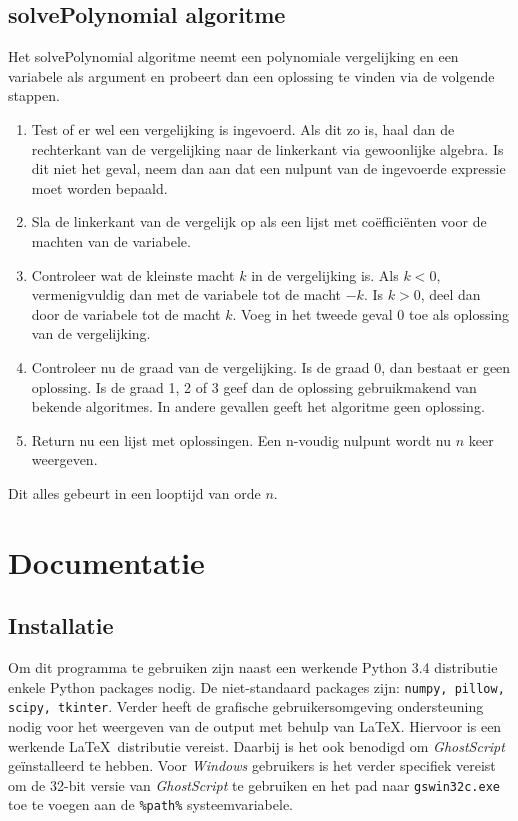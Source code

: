 \documentclass[a4paper]{article}
\begin{document}
\subsection{solvePolynomial algoritme}
Het solvePolynomial algoritme neemt een polynomiale vergelijking en een variabele als argument en probeert dan een oplossing te vinden via de volgende stappen.
\begin{enumerate}
\item Test of er wel een vergelijking is ingevoerd. Als dit zo is, haal dan de rechterkant van de vergelijking naar de linkerkant via gewoonlijke algebra. Is dit niet het geval, neem dan aan dat een nulpunt van de ingevoerde expressie moet worden bepaald.
\item Sla de linkerkant van de vergelijk op als een lijst met co\"effici\"enten voor de machten van de variabele. 
\item Controleer wat de kleinste macht $k$ in de vergelijking is. Als $k<0$, vermenigvuldig dan met de variabele tot de macht $-k$. Is $k>0$, deel dan door de variabele tot de macht $k$. Voeg in het tweede geval 0 toe als oplossing van de vergelijking.
\item Controleer nu de graad van de vergelijking. Is de graad 0, dan bestaat er geen oplossing. Is de graad 1, 2 of 3 geef dan de oplossing gebruikmakend van bekende algoritmes. In andere gevallen geeft het algoritme geen oplossing.
\item Return nu een lijst met oplossingen. Een n-voudig nulpunt wordt nu $n$ keer weergeven.
\end{enumerate}

Dit alles gebeurt in een looptijd van orde $n$. 

\section{Documentatie}
\subsection{Installatie}
Om dit programma te gebruiken zijn naast een werkende Python 3.4 distributie enkele Python packages nodig. De niet-standaard packages zijn: \texttt{numpy, pillow, scipy, tkinter}.
Verder heeft de grafische gebruikersomgeving ondersteuning nodig voor het weergeven van de output met behulp van \LaTeX. Hiervoor is een werkende \LaTeX~distributie vereist. Daarbij is het ook benodigd om \emph{GhostScript} ge\"installeerd te hebben. Voor \emph{Windows} gebruikers is het verder specifiek vereist om de 32-bit versie van \emph{GhostScript} te gebruiken en het pad naar \texttt{gswin32c.exe} toe te voegen aan de \texttt{\%path\%} systeemvariabele.
\end{document}
